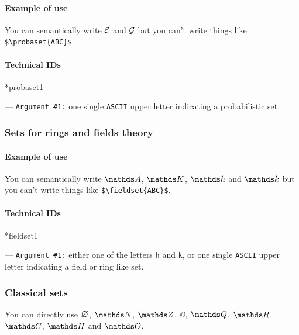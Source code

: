 \documentclass[12pt,a4paper]{article}
\makeatletter
\newcommand\ascii{\texttt{ASCII}}
\newcommand\IDmacro{\@ifstar{\@IDmacroStar}{\@IDmacroNoStar}}
\newcommand\@IDmacroNoStar[3]{%
        \texttt{%
        	\textbackslash#1%
        	\IfStrEq{#2}{0}{}{%
        		\,\,[#2 Option%
				\IfStrEq{#2}{1}{}{s}]%
			}%
    	    \,\,(#3 Argument%
				\IfStrEq{#3}{1}{}{s})%
	   	}
        \immediate\write\tempfile{macro@#1@#2@#3}%
    }
\newcommand\@IDmacroStar[2]{%
        \@IDmacroNoStar{#1}{0}{#2}%
    }
\newcommand\@IDoptarg[2]{%
    	\vspace{0.5em}
		--- \texttt{#1 \##2:}%
	}
\newcommand\IDarg[1]{%
    	\@IDoptarg{Argument}{#1}%
	}
\makeatother
\begin{document}
		\paragraph{Example of use}

\begin{tcblisting}{}
You can semantically write $\probaset{E}$ and $\probaset{G}$
but you can't write things like \verb+$\probaset{ABC}$+.
\end{tcblisting}


		\paragraph{Technical IDs}

\IDmacro*{probaset}{1}

\IDarg{1} one single \ascii{} upper letter indicating a probabilistic set.



    \subsubsection{Sets for rings and fields theory}

		\paragraph{Example of use}

\begin{tcblisting}{}
You can semantically write $\fieldset{A}$, $\fieldset{K}$, $\fieldset{h}$ 
and $\fieldset{k}$ but you can't write things like \verb+$\fieldset{ABC}$+.
\end{tcblisting}


		\paragraph{Technical IDs}

\IDmacro*{fieldset}{1}

\IDarg{1} either one of the letters \texttt{h} and \texttt{k}, or one single \ascii{} upper letter indicating a field or ring like set.



    \subsubsection{Classical sets}

\begin{tcblisting}{}
You can directly use $\nullset$, $\NN$, $\ZZ$, $\DD$, $\QQ$, $\RR$, $\CC$,
$\HH$ and $\OO$.
\end{tcblisting}
\end{document}
